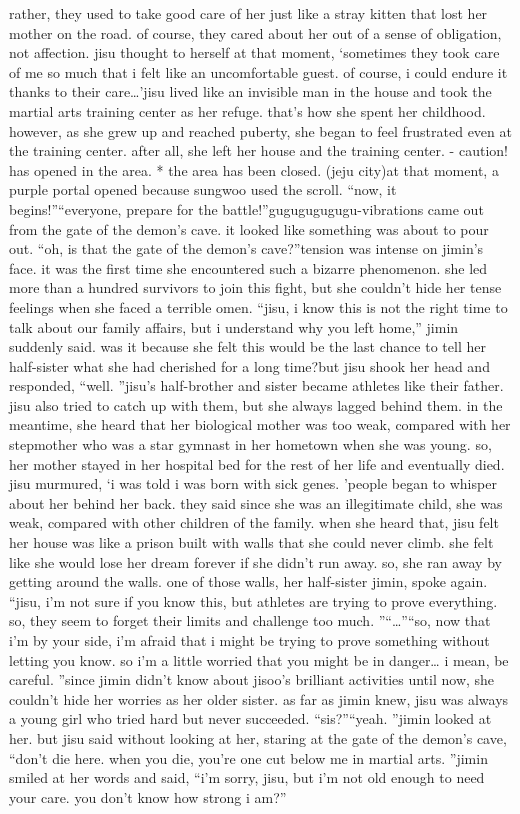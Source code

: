 rather, they used to take good care of her just like a stray kitten that lost her mother on the road.
 of course, they cared about her out of a sense of obligation, not affection.
jisu thought to herself at that moment, ‘sometimes they took care of me so much that i felt like an uncomfortable guest.
 of course, i could endure it thanks to their care…’jisu lived like an invisible man in the house and took the martial arts training center as her refuge.
 that’s how she spent her childhood.
however, as she grew up and reached puberty, she began to feel frustrated even at the training center.
 after all, she left her house and the training center.
- caution!  has opened in the area.
* the area has been closed.
 (jeju city)at that moment, a purple portal opened because sungwoo used the scroll.
“now, it begins!”“everyone, prepare for the battle!”gugugugugugu-vibrations came out from the gate of the demon’s cave.
 it looked like something was about to pour out.
“oh, is that the gate of the demon’s cave?”tension was intense on jimin’s face.
 it was the first time she encountered such a bizarre phenomenon.
 she led more than a hundred survivors to join this fight, but she couldn’t hide her tense feelings when she faced a terrible omen.
“jisu, i know this is not the right time to talk about our family affairs, but i understand why you left home,” jimin suddenly said.
was it because she felt this would be the last chance to tell her half-sister what she had cherished for a long time?but jisu shook her head and responded, “well.
”jisu’s half-brother and sister became athletes like their father.
 jisu also tried to catch up with them, but she always lagged behind them.
in the meantime, she heard that her biological mother was too weak, compared with her stepmother who was a star gymnast in her hometown when she was young.
 so, her mother stayed in her hospital bed for the rest of her life and eventually died.
jisu murmured, ‘i was told i was born with sick genes.
’people began to whisper about her behind her back.
 they said since she was an illegitimate child, she was weak, compared with other children of the family.
when she heard that, jisu felt her house was like a prison built with walls that she could never climb.
 she felt like she would lose her dream forever if she didn’t run away.
 so, she ran away by getting around the walls.
one of those walls, her half-sister jimin, spoke again.
“jisu, i’m not sure if you know this, but athletes are trying to prove everything.
 so, they seem to forget their limits and challenge too much.
”“…”“so, now that i’m by your side, i’m afraid that i might be trying to prove something without letting you know.
 so i’m a little worried that you might be in danger… i mean, be careful.
”since jimin didn’t know about jisoo’s brilliant activities until now, she couldn’t hide her worries as her older sister.
as far as jimin knew, jisu was always a young girl who tried hard but never succeeded.
“sis?”“yeah.
”jimin looked at her.
but jisu said without looking at her, staring at the gate of the demon’s cave, “don’t die here.
 when you die, you’re one cut below me in martial arts.
”jimin smiled at her words and said, “i’m sorry, jisu, but i’m not old enough to need your care.
 you don’t know how strong i am?”

